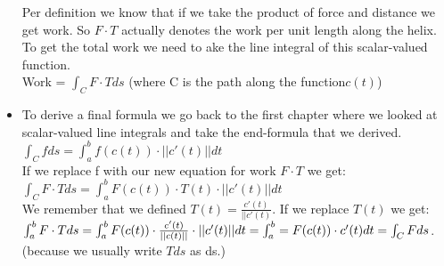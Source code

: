 \documentclass[12pt,a4paper]{article}
\begin{document}
\begin{itemize}
	Per definition we know that if we take the product of force and distance we get work. So $F\cdot T$ actually denotes the work per unit length along the helix. \\
	To get the total work we need to ake the line integral of this scalar-valued function. \\
	Work = $\int_{C}^{} F\cdot T ds$ (where C is the path along the function$c(t)$)
	
	\item To derive a final formula we go back to the first chapter where we looked at scalar-valued line integrals and take the end-formula that we derived.\\
	$\int_{C}^{} f ds = \int_{a}^{b} f(c(t))\cdot ||c'(t)|| dt$\\
	If we replace f with our new equation for work $F\cdot T$ we get:\\
	
	$\int_{C}^{} F\cdot T ds = \int_{a}^{b}F(c(t))\cdot T(t)\cdot ||c'(t)|| dt$\\
	
	We remember that we defined $T(t) =  \frac{c'(t)}{||c'(t)}$. If we replace $T(t)$ we get: \\
	
	$\int_{a}^{b}F\cdot T ds = \int_{a}^{b} F(c(t))\cdot\frac{c'(t)}{||c(t)||}\cdot ||c'(t)|| dt \\= \int_{a}^{b} = F(c(t))\cdot c'(t) dt = \int_{C}^{}F ds$.\\
	(because we usually write $T ds$ as ds.)
	\end{itemize}
	\newpage
	
\end{document}

